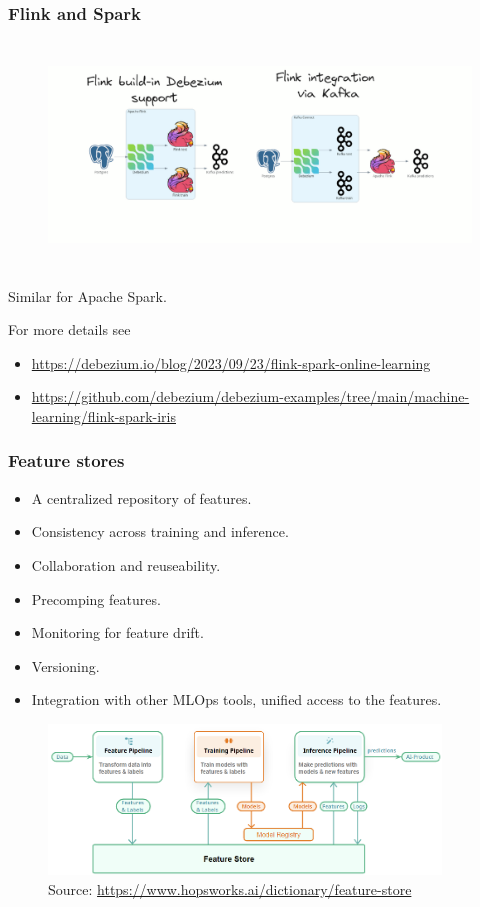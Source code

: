 \documentclass[10pt,utf8]{beamer}
\begin{document}
\begin{frame}
    \frametitle{Flink and Spark}
    \begin{figure}
        \hspace*{-1.1cm}
        \includegraphics[height=6cm]{./img/debezium_flink.eps}
    \end{figure}
    
    \vspace{-1cm}
    Similar for Apache Spark.
    \vspace{0.5cm}
    
    For more details see
    \begin{itemize}
        \item  \footnotesize \color{blue}\url{https://debezium.io/blog/2023/09/23/flink-spark-online-learning}
        \item  \footnotesize \url{https://github.com/debezium/debezium-examples/tree/main/machine-learning/flink-spark-iris}\color{black}
    \end{itemize}
\end{frame}

\begin{frame}
    \frametitle{Feature stores}
    \begin{itemize}
        \item A centralized repository of features.
        \item Consistency across training and inference.
        \item Collaboration and reuseability.
        \item Precomping features.
        \item Monitoring for feature drift.
        \item Versioning.
        \item Integration with other MLOps tools, unified access to the features.
    \end{itemize}

     \begin{figure}
        \centering
        \includegraphics[height=4cm]{./img/featurestore.eps}
        \caption{\tiny{Source: \url{https://www.hopsworks.ai/dictionary/feature-store}}}
    \end{figure}
\end{frame}
\end{document}
